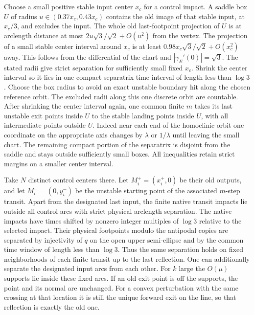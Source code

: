 \documentclass[11pt]{article}
\begin{document}
Choose a small positive stable input center \(x_c\) for a control impact. A
saddle box \(U\) of radius \(u\in(0.37x_c,0.43x_c)\) contains the old image of
that stable input, at \(x_c/3\), and excludes the input. The whole old
last-footpoint projection of \(U\) is at arclength distance at most
\(2u\sqrt3/\sqrt2+O(u^2)\) from the vertex. The projection of a small stable
center interval around \(x_c\) is at least \(0.98x_c\sqrt3/\sqrt2+O(x_c^2)\)
away. This follows from the differential of the chart and
\(|\gamma_E'(0)|=\sqrt3\). The stated radii give strict separation for
sufficiently small fixed \(x_c\). Shrink the center interval so it lies in one
compact separatrix time interval of length less than \(\log3\). Choose the box
radius to avoid an exact unstable boundary hit along the chosen reference orbit.
The excluded radii along this one discrete orbit are countable. After shrinking
the center interval again, one common finite \(m\) takes its last unstable exit
points inside \(U\) to the stable landing points inside \(U\), with all
intermediate points outside \(U\). Indeed near each end of the homoclinic orbit
one coordinate on the appropriate axis changes by \(\lambda\) or \(1/\lambda\)
until leaving the small chart. The remaining compact portion of the separatrix
is disjoint from the saddle and stays outside sufficiently small boxes. All
inequalities retain strict margins on a smaller center interval.

Take \(N\) distinct control centers there. Let \(M_i^+=(x_i^+,0)\) be their old
outputs, and let \(M_i^-=(0,y_i^-)\) be the unstable starting point of the
associated \(m\)-step transit. Apart from the designated last input, the finite
native transit impacts lie outside all control arcs with strict physical
arclength separation. The native impacts have times shifted by nonzero integer
multiples of \(\log3\) relative to the selected impact. Their physical
footpoints modulo the antipodal copies are separated by injectivity of \(q\) on
the open upper semi-ellipse and by the common time window of length less than
\(\log3\). Thus the same separation holds on fixed neighborhoods of each finite
transit up to the last reflection. One can additionally separate the designated
input arcs from each other. For \(k\) large the \(O(\mu)\) supports lie inside
these fixed arcs. If an old exit point is off the supports, the point and its
normal are unchanged. For a convex perturbation with the same crossing at that
location it is still the unique forward exit on the line, so that reflection is
exactly the old one.
\end{document}
